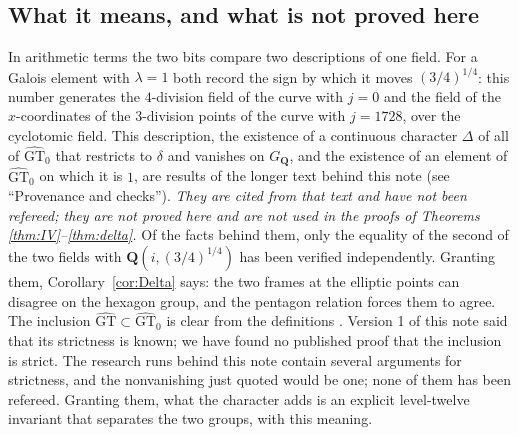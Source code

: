 \documentclass[11pt,a4paper]{article}
\theoremstyle{plain}
\theoremstyle{definition}
\theoremstyle{remark}
\newcommand{\GT}{\widehat{\mathrm{GT}}}
\newcommand{\GTz}{\widehat{\mathrm{GT}}_0}
\newcommand{\Q}{\mathbf Q}
\newcommand{\GQ}{G_{\mathbf Q}}
\begin{document}
\subsection*{What it means, and what is not proved here}
In arithmetic terms the two bits compare two descriptions of one field. For a Galois element with $\lambda=1$ both
record the sign by which it moves $(3/4)^{1/4}$: this number generates the $4$-division field of the curve with
$j=0$ and the field of the $x$-coordinates of the $3$-division points of the curve with $j=1728$, over the
cyclotomic field. This description, the existence of a continuous character $\Delta$ of all of $\GTz$ that
restricts to $\delta$ and vanishes on $\GQ$, and the existence of an element of $\GTz$ on which it is $1$, are
results of the longer text behind this note (see ``Provenance and checks''). \emph{They are cited from that text and
have not been refereed; they are not proved here and are not used in the proofs of Theorems
\ref{thm:IV}--\ref{thm:delta}.} Of the facts behind them, only the equality of the second of the two fields with
$\Q(i,(3/4)^{1/4})$ has been verified independently. Granting them, Corollary~\ref{cor:Delta}
says: the two frames at the elliptic points can disagree on the hexagon group, and the pentagon relation forces
them to agree. The inclusion $\GT\subset\GTz$ is clear from the definitions \cite[p.~2]{DG}. Version 1 of this
note said that its strictness is known; we have found no published proof that the inclusion is strict. The research
runs behind this note contain several arguments for strictness, and the nonvanishing just quoted would be one; none
of them has been refereed. Granting them, what the character adds is an explicit level-twelve invariant that
separates the two groups, with this meaning.
\end{document}
